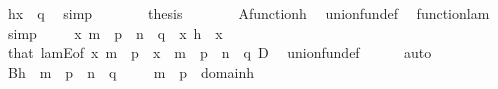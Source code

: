 \begin{isabellebody}
\ {\isachardoublequoteopen}{\isacharquery}{\kern0pt}h{\isacharbackquote}{\kern0pt}x\ {\isasymin}\ q{\isachardoublequoteclose}\ \isamarkupfalse%
\ simp\isanewline
\ \ \ \ \isamarkupfalse%
\ \isamarkupfalse%
\ {\isacharquery}{\kern0pt}thesis\ \isacommand{{\isachardot}{\kern0pt}{\isachardot}{\kern0pt}}\isamarkupfalse%
\isanewline
\ \ \isamarkupfalse%
\isanewline
\ \ \isamarkupfalse%
\ A{\isacharcolon}{\kern0pt}{\isachardoublequoteopen}function{\isacharparenleft}{\kern0pt}{\isacharquery}{\kern0pt}h{\isacharparenright}{\kern0pt}{\isachardoublequoteclose}\ \isamarkupfalse%
\ union{\isacharunderscore}{\kern0pt}fun{\isacharunderscore}{\kern0pt}def\ \isamarkupfalse%
\ function{\isacharunderscore}{\kern0pt}lam\ \isamarkupfalse%
\ simp\isanewline
\ \ \isamarkupfalse%
\ {\isachardoublequoteopen}\ x{\isasymin}\ {\isacharparenleft}{\kern0pt}m\ {\isasymunion}\ p{\isacharparenright}{\kern0pt}\ {\isasymtimes}\ {\isacharparenleft}{\kern0pt}n\ {\isasymunion}\ q{\isacharparenright}{\kern0pt}{\isachardoublequoteclose}\ \ {\isachardoublequoteopen}x{\isasymin}\ {\isacharquery}{\kern0pt}h{\isachardoublequoteclose}\ \ x\isanewline
\ \ \ \ \isamarkupfalse%
\ that\ lamE{\isacharbrackleft}{\kern0pt}of\ x\ {\isachardoublequoteopen}m\ {\isasymunion}\ p{\isachardoublequoteclose}\ {\isacharunderscore}{\kern0pt}\ {\isachardoublequoteopen}x\ {\isasymin}\ {\isacharparenleft}{\kern0pt}m\ {\isasymunion}\ p{\isacharparenright}{\kern0pt}\ {\isasymtimes}\ {\isacharparenleft}{\kern0pt}n\ {\isasymunion}\ q{\isacharparenright}{\kern0pt}{\isachardoublequoteclose}{\isacharbrackright}{\kern0pt}\ D\ \isamarkupfalse%
\ union{\isacharunderscore}{\kern0pt}fun{\isacharunderscore}{\kern0pt}def\isanewline
\ \ \ \ \isamarkupfalse%
\ auto\isanewline
\ \ \isamarkupfalse%
\ \isamarkupfalse%
\ B{\isacharcolon}{\kern0pt}{\isachardoublequoteopen}{\isacharquery}{\kern0pt}h\ {\isasymsubseteq}\ {\isacharparenleft}{\kern0pt}m\ {\isasymunion}\ p{\isacharparenright}{\kern0pt}\ {\isasymtimes}\ {\isacharparenleft}{\kern0pt}n\ {\isasymunion}\ q{\isacharparenright}{\kern0pt}{\isachardoublequoteclose}\ \isacommand{{\isachardot}{\kern0pt}{\isachardot}{\kern0pt}}\isamarkupfalse%
\isanewline
\ \ \isamarkupfalse%
\ {\isachardoublequoteopen}m\ {\isasymunion}\ p\ {\isasymsubseteq}\ domain{\isacharparenleft}{\kern0pt}{\isacharquery}{\kern0pt}h{\isacharparenright}{\kern0pt}{\isachardoublequoteclose}\isanewline

\end{isabellebody}
